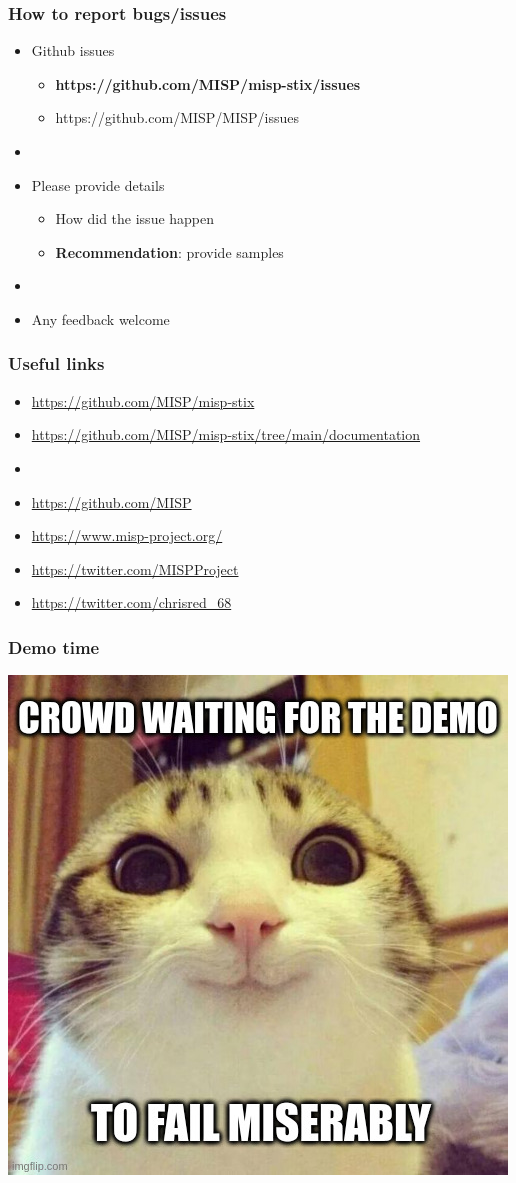 \begin{frame}
    \frametitle{How to report bugs/issues}
    \begin{itemize}
        \item Github issues
        \begin{itemize}
            \item {\bf https://github.com/MISP/misp-stix/issues}
            \item https://github.com/MISP/MISP/issues
        \end{itemize}
        \item []
        \item Please provide details
        \begin{itemize}
            \item How did the issue happen
            \item {\bf Recommendation}: provide samples
        \end{itemize}
        \item[]
        \item Any feedback welcome
    \end{itemize}
\end{frame}

\begin{frame}
    \frametitle{Useful links}
    \begin{itemize}
        \item \url{https://github.com/MISP/misp-stix}
        \item \url{https://github.com/MISP/misp-stix/tree/main/documentation}
        \item []
        \item \url{https://github.com/MISP}
        \item \url{https://www.misp-project.org/}
        \item \url{https://twitter.com/MISPProject}
        \item \url{https://twitter.com/chrisred_68}
    \end{itemize}
\end{frame}

\begin{frame}
    \frametitle{Demo time}
    \centering
    \includegraphics[scale=0.45]{images/demo.jpg}
\end{frame}
